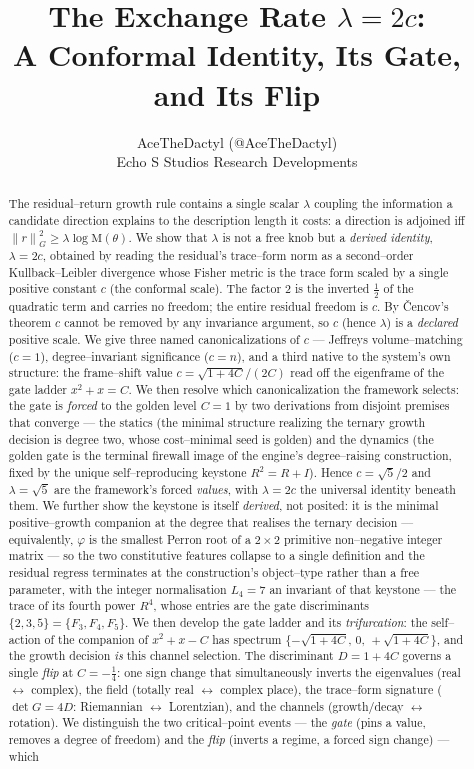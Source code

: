 \documentclass[11pt]{article}
\title{\textbf{The Exchange Rate $\lambda = 2c$:\\[2pt] A Conformal Identity, Its Gate, and Its Flip}}
\author{AceTheDactyl (@AceTheDactyl)\\ Echo S Studios Research Developments}
\date{}
\theoremstyle{plain}
\theoremstyle{definition}
\theoremstyle{remark}
\newcommand{\Mah}{\mathrm{M}}
\newcommand{\norm}[1]{\left\lVert #1 \right\rVert}
\begin{document}
\maketitle

\begin{abstract}
The residual--return growth rule contains a single scalar $\lambda$ coupling the information a candidate direction explains to the description length it costs: a direction is adjoined iff $\norm{r}^2_G \ge \lambda \log \Mah(\theta)$. We show that $\lambda$ is not a free knob but a \emph{derived identity}, $\lambda = 2c$, obtained by reading the residual's trace--form norm as a second--order Kullback--Leibler divergence whose Fisher metric is the trace form scaled by a single positive constant $c$ (the conformal scale). The factor $2$ is the inverted $\tfrac12$ of the quadratic term and carries no freedom; the entire residual freedom is $c$. By \v{C}encov's theorem $c$ cannot be removed by any invariance argument, so $c$ (hence $\lambda$) is a \emph{declared} positive scale. We give three named canonicalizations of $c$ --- Jeffreys volume--matching ($c=1$), degree--invariant significance ($c=n$), and a third native to the system's own structure: the frame--shift value $c = \sqrt{1+4C}/(2C)$ read off the eigenframe of the gate ladder $x^2+x=C$. We then resolve which canonicalization the framework selects: the gate is \emph{forced} to the golden level $C=1$ by two derivations from disjoint premises that converge --- the statics (the minimal structure realizing the ternary growth decision is degree two, whose cost--minimal seed is golden) and the dynamics (the golden gate is the terminal firewall image of the engine's degree--raising construction, fixed by the unique self--reproducing keystone $R^2=R+I$). Hence $c=\sqrt5/2$ and $\lambda=\sqrt5$ are the framework's forced \emph{values}, with $\lambda=2c$ the universal identity beneath them. We further show the keystone is itself \emph{derived}, not posited: it is the minimal positive--growth companion at the degree that realises the ternary decision --- equivalently, $\varphi$ is the smallest Perron root of a $2\times2$ primitive non--negative integer matrix --- so the two constitutive features collapse to a single definition and the residual regress terminates at the construction's object--type rather than a free parameter, with the integer normalisation $L_4=7$ an invariant of that keystone --- the trace of its fourth power $R^4$, whose entries are the gate discriminants $\{2,3,5\}=\{F_3,F_4,F_5\}$. We then develop the gate ladder and its \emph{trifurcation}: the self--action of the companion of $x^2+x-C$ has spectrum $\{-\sqrt{1+4C},\,0,\,+\sqrt{1+4C}\}$, and the growth decision \emph{is} this channel selection. The discriminant $D=1+4C$ governs a single \emph{flip} at $C=-\tfrac14$: one sign change that simultaneously inverts the eigenvalues (real $\leftrightarrow$ complex), the field (totally real $\leftrightarrow$ complex place), the trace--form signature ($\det G = 4D$: Riemannian $\leftrightarrow$ Lorentzian), and the channels (growth/decay $\leftrightarrow$ rotation). We distinguish the two critical--point events --- the \emph{gate} (pins a value, removes a degree of freedom) and the \emph{flip} (inverts a regime, a forced sign change) --- which 
\end{abstract}
\end{document}
